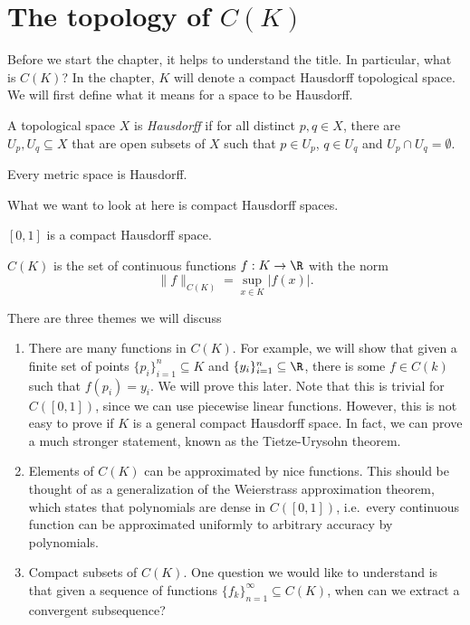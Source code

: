 \documentclass[a4paper]{article}
\begin{document}
\section{The topology of \texorpdfstring{$C(K)$}{C(K)}}
Before we start the chapter, it helps to understand the title. In particular, what is $C(K)$? In the chapter, $K$ will denote a compact Hausdorff topological space. We will first define what it means for a space to be Hausdorff.

\begin{defi}
  A topological space $X$ is \emph{Hausdorff} if for all distinct $p, q \in X$, there are $U_p, U_q \subseteq X$ that are open subsets of $X$ such that $p \in U_p$, $q\in U_q$ and $U_p\cap U_q = \emptyset$.
\end{defi}

\begin{eg}
  Every metric space is Hausdorff.
\end{eg}

What we want to look at here is compact Hausdorff spaces.
\begin{eg}
  $[0, 1]$ is a compact Hausdorff space.
\end{eg}

\begin{notation}
  $C(K)$ is the set of continuous functions $f: K \to \R$ with the norm
  \[
    \|f\|_{C(K)} = \sup_{x \in K} |f(x)|.
  \]
\end{notation}
There are three themes we will discuss
\begin{enumerate}
  \item There are many functions in $C(K)$. For example, we will show that given a finite set of points $\{p_i\}_{i = 1}^n \subseteq K$ and $\{y_i\}_{i = 1}^n \subseteq \R$, there is some $f \in C(k)$ such that $f(p_i) = y_i$. We will prove this later. Note that this is trivial for $C([0, 1])$, since we can use piecewise linear functions. However, this is not easy to prove if $K$ is a general compact Hausdorff space. In fact, we can prove a much stronger statement, known as the Tietze-Urysohn theorem.

  \item Elements of $C(K)$ can be approximated by nice functions. This should be thought of as a generalization of the Weierstrass approximation theorem, which states that polynomials are dense in $C([0, 1])$, i.e.\ every continuous function can be approximated uniformly to arbitrary accuracy by polynomials.

  \item Compact subsets of $C(K)$. One question we would like to understand is that given a sequence of functions $\{f_k\}_{n = 1}^\infty \subseteq C(K)$, when can we extract a convergent subsequence?
\end{enumerate}
\end{document}

